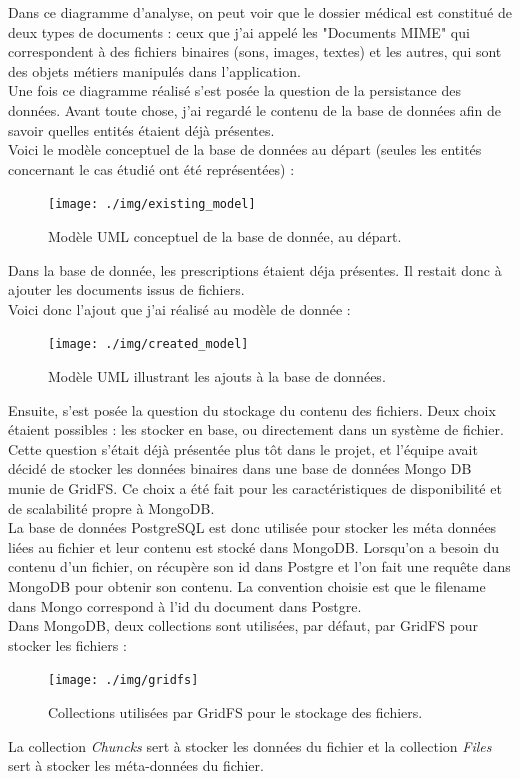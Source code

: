 Dans ce diagramme d'analyse, on peut voir que le dossier médical est constitué de deux types de documents : ceux que j'ai appelé les "Documents MIME" qui correspondent à des fichiers binaires (sons, images, textes) et les autres, qui sont des objets métiers manipulés dans l'application.\\

Une fois ce diagramme réalisé s'est posée la question de la persistance des données. Avant toute chose, j'ai regardé le contenu de la base de données afin de savoir quelles entités étaient déjà présentes.\\
Voici le modèle conceptuel de la base de données au départ (seules les entités concernant le cas étudié ont été représentées)  :

\begin{figure}[H]
  \centering
  \texttt{[image: ./img/existing\_model]}
  \caption{\label{fig:mb_va_ast} Modèle UML conceptuel de la base de donnée, au départ.}
\end{figure}

Dans la base de donnée, les prescriptions étaient déja présentes. Il restait donc à ajouter les documents issus de fichiers. \\
Voici donc l'ajout que j'ai réalisé au modèle de donnée : 
\begin{figure}[H]
  \centering
  \texttt{[image: ./img/created\_model]}
  \caption{\label{fig:mb_va_ast} Modèle UML illustrant les ajouts à la base de données.}
\end{figure}

Ensuite, s'est posée la question du stockage du contenu des fichiers. Deux choix étaient possibles : les stocker en base, ou directement dans un système de fichier. Cette question s'était déjà présentée plus tôt dans le projet, et l'équipe avait décidé de stocker les données binaires dans une base de données Mongo DB munie de GridFS. Ce choix a été fait pour les caractéristiques de disponibilité et de scalabilité propre à MongoDB.\\
La base de données PostgreSQL est donc utilisée pour stocker les méta données liées au fichier et leur contenu est stocké dans MongoDB. Lorsqu'on a besoin du contenu d'un fichier, on récupère son id dans Postgre et l'on fait une requête dans MongoDB pour obtenir son contenu. La convention choisie est que le filename dans Mongo correspond à l'id du document dans Postgre. \\

Dans MongoDB, deux collections sont utilisées, par défaut, par GridFS pour stocker les fichiers :  
\begin{figure}[H]
  \centering
  \texttt{[image: ./img/gridfs]}
  \caption{\label{fig:mb_va_ast} Collections utilisées par GridFS pour le stockage des fichiers.}
\end{figure}
La collection \textit{Chuncks} sert à stocker les données du fichier et la collection \textit{Files} sert à stocker les méta-données du fichier.

